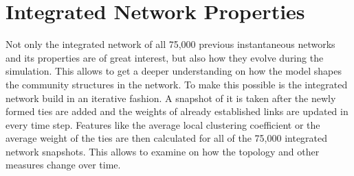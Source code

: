 

\section{Integrated Network Properties}
\label{sec:integrated-network-properties}

Not only the integrated network of all 75,000 previous instantaneous networks and its properties are of great interest, but also how they evolve during the simulation.
This allows to get a deeper understanding on how the model shapes the community structures in the network.
To make this possible is the integrated network build in an iterative fashion.
A snapshot of it is taken after the newly formed ties are added and the weights of already established links are updated in every time step.
Features like the average local clustering coefficient or the average weight of the ties are then calculated for all of the 75,000 integrated network snapshots.
This allows to examine on how the topology and other measures change over time.

